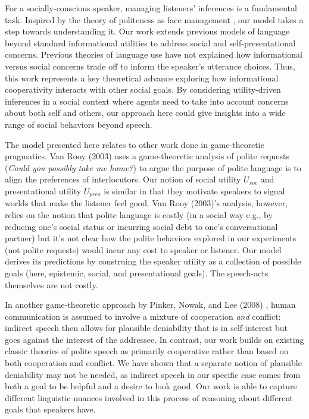 \documentclass[9pt,twocolumn,twoside,lineno]{main_class_file}
\begin{document}
For a socially-conscious speaker, managing listeners' inferences is a
fundamental task. Inspired by the theory of politeness as face
management \cite{brown1987}, our model takes a step towards
understanding it. Our work extends previous models of language beyond
standard informational utilities to address social and
self-presentational concerns. Previous theories of language use have not
explained how informational versus social concerns trade off to inform
the speaker's utterance choices. Thus, this work represents a key
theoretical advance exploring how informational cooperativity interacts
with other social goals. By considering utility-driven inferences in a
social context \cite{baker2017rational, hamlin2013mentalistic} where agents need to take
into account concerns about both self and others, our approach here
could give insights into a wide range of social behaviors beyond speech.

The model presented here relates to other work done in game-theoretic
pragmatics. Van Rooy (2003) \cite{vanRooy2003} uses a game-theoretic analysis of polite
requests (\emph{Could you possibly take me home?}) to argue the
purpose of polite language is to align the preferences of interlocutors.
Our notion of social utility \(U_{soc}\) and presentational utility
\(U_{pres}\) is similar in that they motivate speakers to signal worlds
that make the listener feel good. Van Rooy (2003)'s analysis, however,
relies on the notion that polite language is costly (in a social way
e.g., by reducing one's social status or incurring social debt to one's
conversational partner) but it's not clear how the polite behaviors
explored in our experiments (not polite requests) would incur any cost
to speaker or listener. Our model derives its predictions by construing
the speaker utility as a collection of possible goals (here, epistemic,
social, and presentational goals). The speech-acts themselves are not
costly.

In another game-theoretic approach by Pinker, Nowak, and Lee (2008) \cite{pinker2008},
human communication is assumed to involve a mixture of cooperation
\emph{and} conflict: indirect speech then allows for plausible
deniability that is in self-interest but goes against the interest of
the addressee. In contrast, our work builds on existing classic theories
of polite speech as primarily cooperative \cite{brown1987, goffman1967} 
rather than based on both cooperation and conflict. We have
shown that a separate notion of plausible deniability may not be needed,
as indirect speech in our specific case comes from both a goal to be
helpful and a desire to look good. Our work is able to capture different
linguistic nuances involved in this process of reasoning about different
goals that speakers have.
\end{document}
